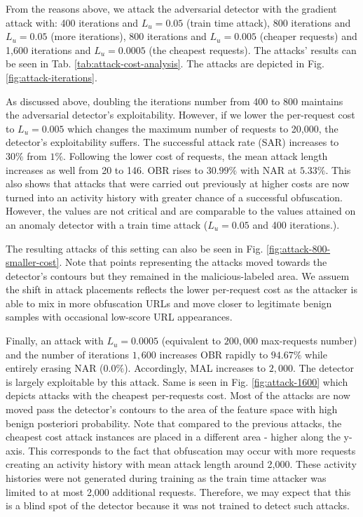From the reasons above, we attack the adversarial detector with the gradient attack with: 400 iterations and $L_u = 0.05$ (train time attack), 800 iterations and $L_u = 0.05$ (more iterations), 800 iterations and $L_u = 0.005$ (cheaper requests) and 1,600 iterations and $L_u = 0.0005$ (the cheapest requests). The attacks' results can be seen in Tab. \ref{tab:attack-cost-analysis}. The attacks are depicted in Fig. \ref{fig:attack-iterations}.

As discussed above, doubling the iterations number from 400 to 800 maintains the adversarial detector's exploitability. However, if we lower the per-request cost to $L_u = 0.005$ which changes the maximum number of requests to 20,000, the detector's exploitability suffers. The successful attack rate (SAR) increases to $30\%$ from $1 \%$. Following the lower cost of requests, the mean attack length increases as well from 20 to 146. OBR rises to $30.99\%$ with NAR at $5.33\%$. This also shows that attacks that were carried out previously at higher costs are now turned into an activity history with greater chance of a successful obfuscation. However, the values are not critical and are comparable to the values attained on an anomaly detector with a train time attack ($L_u = 0.05$ and 400 iterations.).

The resulting attacks of this setting can also be seen in Fig. \ref{fig:attack-800-smaller-cost}. Note that points representing the attacks moved towards the detector's contours but they remained in the malicious-labeled area. We assuem the shift in attack placements reflects the lower per-request cost as the attacker is able to mix in more obfuscation URLs and move closer to legitimate benign samples with occasional low-score URL appearances.

Finally, an attack with $L_u = 0.0005$ (equivalent to $200,000$ max-requests number) and the number of iterations $1,600$ increases OBR rapidly to $94.67 \%$ while entirely erasing NAR ($ 0.0\%$). Accordingly, MAL increases to $2,000$. The detector is largely exploitable by this attack. Same is seen in Fig. \ref{fig:attack-1600} which depicts attacks with the cheapest per-requests cost. Most of the attacks are now moved pass the detector's contours to the area of the feature space with high benign posteriori probability. Note that compared to the previous attacks, the cheapest cost attack instances are placed in a different area - higher along the y-axis. This corresponds to the fact that obfuscation may occur with more requests creating an activity history with mean attack length around 2,000. These activity histories were not generated during training as the train time attacker was limited to at most 2,000 additional requests. Therefore, we may expect that this is a blind spot of the detector because it was not trained to detect such attacks.

